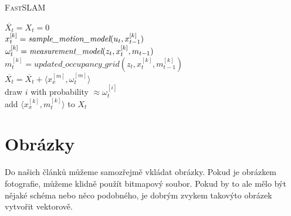 \documentclass[a4paper, 11pt]{article}
\begin{document}
    \begin{algorithm}[h] \label{algoritmus} %
        \caption{\textsc{FastSLAM}}
        \SetNlSty{}{}{:} %
        \SetNlSkip{-12pt} %
        \SetAlgoNoLine %
        \BlankLine
        \Indpp\Indp$\overline{X_t}=X_t=0$ \\
        {
            \Indpp
            $x_t^{[k]}=\emph{sample\_motion\_model}(u_t,x_{t-1}^{[k]})$\\
            $\omega_t^{[k]}=\emph{measurement\_model}(z_t,x_t^{[k]}, m_{t-1})$\\
            $m_t^{[k]}=updated\_occupancy\_grid(z_t, x_t^{[k]},m_{t-1}^{[k]})$\\
            $\overline{X_t}=\overline{X_t}+\langle x_x^{[m]},\omega_t^{[m]}\rangle$\\
        }
        {
            \Indpp
            draw $i$ with probability $\approx\omega_t^{[i]}$\\
            add $\langle x_x^{[k]},m_t^{[k]}\rangle$ to $X_t$\\
        }
    \end{algorithm}

\section{Obrázky}
    Do našich článků můžeme samozřejmě vkládat obrázky. Pokud je obrázkem fotografie, můžeme klidně použít bitmapový soubor. Pokud by to ale mělo být nějaké schéma nebo něco podobného, je dobrým zvykem takovýto obrázek vytvořit vektorově.
\end{document}
